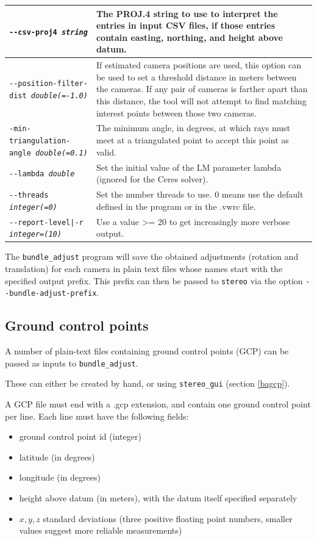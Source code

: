 \begin{longtable}{|l|p{7.5cm}|}
\texttt{-\/-csv-proj4 \textit{string}} & The PROJ.4 string to use to
interpret the entries in input CSV files, if those entries contain
easting, northing, and height above datum. \\ \hline

\texttt{-\/-position-filter-dist \textit{double(=-1.0)}} &
If estimated camera positions are used, this option can be used to set a threshold distance in meters
between the cameras.  If any pair of cameras is farther apart than this distance, the tool will not
attempt to find matching interest points between those two cameras.
\\ \hline

\texttt{-\/min-triangulation-angle \textit{double(=0.1)}} &
The minimum angle, in degrees, at which rays must meet at a triangulated point to accept this point as valid.
\\ \hline

\texttt{-\/-lambda \textit{double}} & Set the initial value of the LM parameter
lambda (ignored for the Ceres solver).\\ \hline

\texttt{-\/-threads \textit{integer(=0)}} & Set the number threads to use. 0 means use the default defined in the program or in the .vwrc file.\\ \hline

\texttt{-\/-report-level|-r \textit{integer=(10)}} & Use a value >= 20 to
get increasingly more verbose output. \\ \hline
\end{longtable}

The \texttt{bundle\_adjust} program will save the obtained adjustments
(rotation and translation) for each camera in plain text files whose
names start with the specified output prefix. This prefix can then be
passed to \texttt{stereo} via the option
\texttt{-\/-bundle-adjust-prefix}.

\subsection{Ground control points}

A number of plain-text files containing ground control points (GCP) can be
passed as inputs to \texttt{bundle\_adjust}.

These can either be created by hand, or using \texttt{stereo\_gui}
(section \ref{bagcp}).

A GCP file must end with a .gcp extension, and contain one ground
control point per line. Each line must have the following fields:
\begin{itemize}
\item ground control point id (integer)
\item latitude (in degrees)
\item longitude (in degrees)
\item height above datum (in meters), with the datum itself specified separately
\item $x, y, z$ standard deviations (three positive floating point
  numbers, smaller values suggest more reliable measurements)
\end{itemize}

